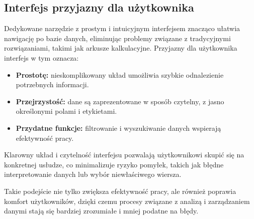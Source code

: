 \subsection{Interfejs przyjazny dla użytkownika}
Dedykowane narzędzie z prostym i intuicyjnym interfejsem znacząco ułatwia nawigację po bazie danych, eliminując problemy związane z tradycyjnymi rozwiązaniami, takimi jak arkusze kalkulacyjne. Przyjazny dla użytkownika interfejs w tym oznacza:
\begin{itemize}
    \item \textbf{Prostotę:} nieskomplikowany układ umożliwia szybkie odnalezienie potrzebnych informacji.
    \item \textbf{Przejrzystość:} dane są zaprezentowane w sposób czytelny, z jasno określonymi polami i etykietami.
    \item \textbf{Przydatne funkcje:} filtrowanie i wyszukiwanie danych wspierają efektywność pracy.
\end{itemize}
Klarowny układ i czytelność interfejsu pozwalają użytkownikowi skupić się na konkretnej usłudze, co minimalizuje ryzyko pomyłek, takich jak błędne interpretowanie danych lub wybór niewłaściwego wiersza.

Takie podejście nie tylko zwiększa efektywność pracy, ale również poprawia komfort użytkowników, dzięki czemu procesy związane z analizą i zarządzaniem danymi stają się bardziej zrozumiałe i mniej podatne na błędy.